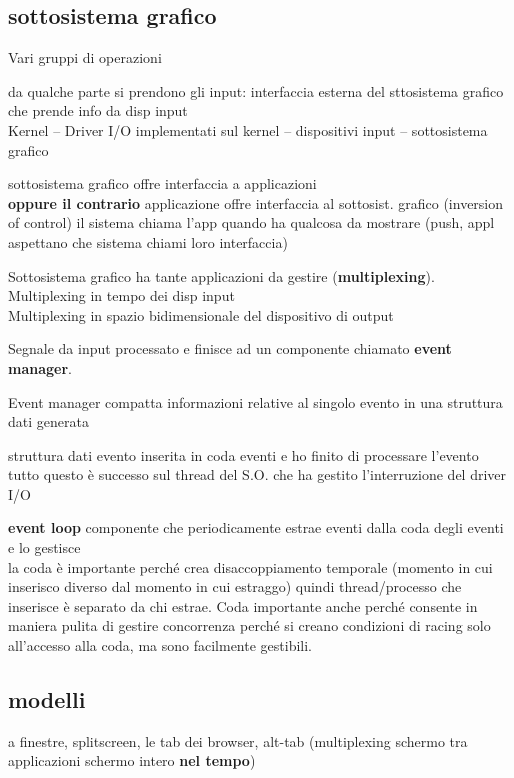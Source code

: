 \documentclass[10pt]{article}
\begin{document}
\subsection{sottosistema grafico}
Vari gruppi di operazioni
\begin{list}{}{}
\item da qualche parte si prendono gli input: interfaccia esterna del sttosistema grafico che prende info da disp input\\
Kernel -- Driver I/O implementati sul kernel -- dispositivi input -- sottosistema grafico
\item sottosistema grafico offre interfaccia a applicazioni\\
\textbf{oppure il contrario} applicazione offre interfaccia al sottosist. grafico (inversion of control) il sistema chiama l'app quando ha qualcosa da mostrare (push, appl aspettano che sistema chiami loro interfaccia)
\item Sottosistema grafico ha tante applicazioni da gestire (\textbf{multiplexing}).\\
Multiplexing in tempo dei disp input\\
Multiplexing in spazio bidimensionale del dispositivo di output\\
\item Segnale da input processato e finisce ad un componente  chiamato \textbf{event manager}.
\item Event manager compatta informazioni relative al singolo evento in una struttura dati generata
\item struttura dati evento inserita in coda eventi e ho finito di processare l'evento\\
tutto questo è successo sul thread del S.O. che ha gestito l'interruzione del driver I/O
\item \textbf{event loop} componente che periodicamente estrae eventi dalla coda degli eventi e lo gestisce\\
la coda è importante perché crea disaccoppiamento temporale (momento in cui inserisco diverso dal momento in cui estraggo) quindi thread/processo che inserisce è separato da chi estrae. Coda importante anche perché consente in maniera pulita di gestire concorrenza perché si creano condizioni di racing solo all'accesso alla coda, ma sono facilmente gestibili.
\end{list}
\subsection{modelli}
a finestre, splitscreen, le tab dei browser, alt-tab (multiplexing schermo tra applicazioni schermo intero \textbf{nel tempo})
\end{document}
